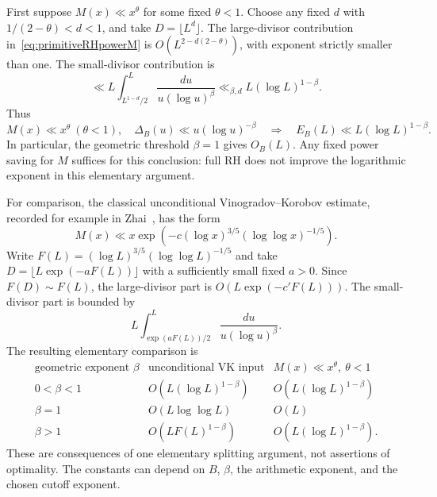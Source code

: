 \documentclass[11pt,a4paper]{article}
\numberwithin{equation}{section}
\theoremstyle{definition}
\theoremstyle{remark}
\begin{document}
First suppose $M(x)\ll x^\theta$ for some fixed $\theta<1$.
Choose any fixed $d$ with
$1/(2-\theta)<d<1$, and take $D=\lfloor L^d\rfloor$.
The large-divisor contribution in~\eqref{eq:primitiveRHpowerM} is
$O(L^{2-d(2-\theta)})$, with exponent strictly smaller than one.
The small-divisor contribution is
\[
 \ll L\int_{L^{1-d}/2}^L\frac{du}{u(\log u)^\beta}
 \ll_{\beta,d} L(\log L)^{1-\beta}.
\]
Thus
\begin{equation}\label{eq:primitiveRHlogresult}
 M(x)\ll x^\theta\ (\theta<1),\quad
 \Delta_B(u)\ll u(\log u)^{-\beta}
 \quad\Longrightarrow\quad
 E_B(L)\ll L(\log L)^{1-\beta}.
\end{equation}
In particular, the geometric threshold $\beta=1$ gives $O_B(L)$.
Any fixed power saving for $M$ suffices for this conclusion: full RH
does not improve the logarithmic exponent in this elementary argument.

For comparison, the classical unconditional Vinogradov--Korobov estimate,
recorded for example in Zhai~\cite[eq.~(1.5)]{ZhaiPrimitive2003}, has the form
\[
 M(x)\ll x\exp\!\left(-c(\log x)^{3/5}
                              (\log\log x)^{-1/5}\right).
\]
Write $F(L)=(\log L)^{3/5}(\log\log L)^{-1/5}$ and take
$D=\lfloor L\exp(-aF(L))\rfloor$ with a sufficiently small fixed
$a>0$.  Since $F(D)\sim F(L)$, the large-divisor part is
$O(L\exp(-c'F(L)))$.  The small-divisor part is bounded by
\[
 L\int_{\exp(aF(L))/2}^L\frac{du}{u(\log u)^\beta}.
\]
The resulting elementary comparison is
\[
\begin{array}{c|c|c}
 \text{geometric exponent }\beta
 &\text{unconditional VK input}
 &M(x)\ll x^\theta,\ \theta<1\\ \hline
 0<\beta<1
 &O\!\left(L(\log L)^{1-\beta}\right)
 &O\!\left(L(\log L)^{1-\beta}\right)\\[2pt]
 \beta=1
 &O(L\log\log L)
 &O(L)\\[2pt]
 \beta>1
 &O\!\left(LF(L)^{1-\beta}\right)
 &O\!\left(L(\log L)^{1-\beta}\right).
\end{array}
\]
These are consequences of one elementary splitting argument, not
assertions of optimality.  The constants can depend on $B$, $\beta$,
the arithmetic exponent, and the chosen cutoff exponent.
\end{document}
